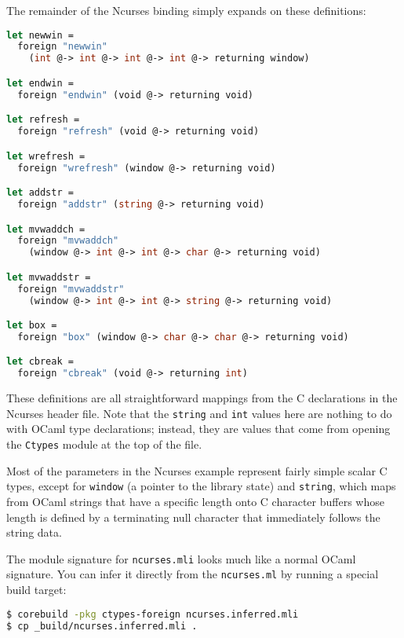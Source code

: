 The remainder of the Ncurses binding simply expands on these
definitions:

\begin{lstlisting}[language=Caml]
let newwin =
  foreign "newwin"
    (int @-> int @-> int @-> int @-> returning window)

let endwin =
  foreign "endwin" (void @-> returning void)

let refresh =
  foreign "refresh" (void @-> returning void)

let wrefresh =
  foreign "wrefresh" (window @-> returning void)

let addstr =
  foreign "addstr" (string @-> returning void)

let mvwaddch =
  foreign "mvwaddch"
    (window @-> int @-> int @-> char @-> returning void)

let mvwaddstr =
  foreign "mvwaddstr"
    (window @-> int @-> int @-> string @-> returning void)

let box =
  foreign "box" (window @-> char @-> char @-> returning void)

let cbreak =
  foreign "cbreak" (void @-> returning int)
\end{lstlisting}

These definitions are all straightforward mappings from the C
declarations in the Ncurses header file. Note that the
\passthrough{\lstinline!string!} and \passthrough{\lstinline!int!}
values here are nothing to do with OCaml type declarations; instead,
they are values that come from opening the
\passthrough{\lstinline!Ctypes!} module at the top of the file.

Most of the parameters in the Ncurses example represent fairly simple
scalar C types, except for \passthrough{\lstinline!window!} (a pointer
to the library state) and \passthrough{\lstinline!string!}, which maps
from OCaml strings that have a specific length onto C character buffers
whose length is defined by a terminating null character that immediately
follows the string data.

The module signature for \passthrough{\lstinline!ncurses.mli!} looks
much like a normal OCaml signature. You can infer it directly from the
\passthrough{\lstinline!ncurses.ml!} by running a special build target:

\begin{lstlisting}[language=bash]
$ corebuild -pkg ctypes-foreign ncurses.inferred.mli
$ cp _build/ncurses.inferred.mli .
\end{lstlisting}

